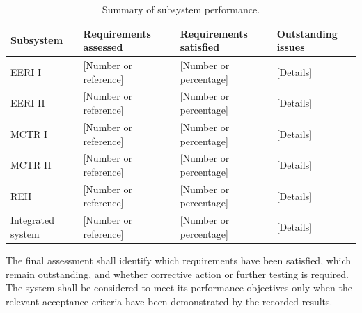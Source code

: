 \begin{table}[H]
    \centering
    \caption{Summary of subsystem performance.}
    \label{tab:system-performance-summary}
    \renewcommand{\arraystretch}{1.4}
    \begin{tabularx}{\textwidth}{|X|X|X|X|}
        \hline
        \textbf{Subsystem} &
        \textbf{Requirements assessed} &
        \textbf{Requirements satisfied} &
        \textbf{Outstanding issues} \\
        \hline
        EERI I & [Number or reference] &
        [Number or percentage] & [Details] \\
        \hline
        EERI II & [Number or reference] &
        [Number or percentage] & [Details] \\
        \hline
        MCTR I & [Number or reference] &
        [Number or percentage] & [Details] \\
        \hline
        MCTR II & [Number or reference] &
        [Number or percentage] & [Details] \\
        \hline
        REII & [Number or reference] &
        [Number or percentage] & [Details] \\
        \hline
        Integrated system & [Number or reference] &
        [Number or percentage] & [Details] \\
        \hline
    \end{tabularx}
\end{table}

The final assessment shall identify which requirements have been
satisfied, which remain outstanding, and whether corrective action
or further testing is required. The system shall be considered to
meet its performance objectives only when the relevant acceptance
criteria have been demonstrated by the recorded results.

